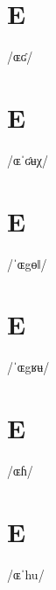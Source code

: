 \documentclass[10pt,a4paper,twoside]{book}
\begin{document}
\section*{E}

\begin{multicols}{3}
 {/ɶʛ/} {}
\end{multicols}

\section*{E}

\begin{multicols}{3}
 {/ɶˈʛʉχ/} {}
\end{multicols}

\section*{E}

\begin{multicols}{3}
 {/ˈɶgɵǁ/} {}
\end{multicols}

\section*{E}

\begin{multicols}{3}
 {/ˈɶgʁʉ/} {}
\end{multicols}

\section*{E}

\begin{multicols}{3}
 {/ɶɦ/} {}
\end{multicols}

\section*{E}

\begin{multicols}{3}
 {/ɶˈhu/} {}
\end{multicols}
\end{document}
